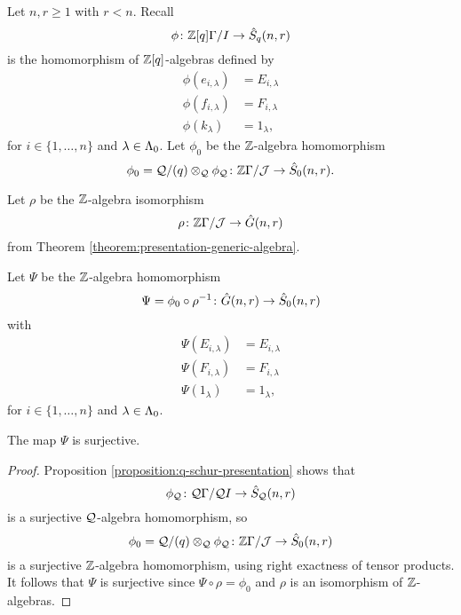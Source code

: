 \documentclass[a4paper, 11pt]{report}
\begin{document}
Let $n,r\geq 1$ with $r<n$. Recall
\begin{equation*}
\phi\colon\mathbb{Z}[q]\Gamma/I \to\hat{S}_q(n,r)
\end{equation*}
is the homomorphism of $\mathbb{Z}[q]$-algebras defined by
\begin{align*}
\phi(e_{i,\lambda})&= E_{i,\lambda}\\
\phi(f_{i,\lambda})&= F_{i,\lambda}\\
\phi(k_\lambda)&= 1_\lambda,
\end{align*}
for $i\in\{1,\ldots,n\}$ and $\lambda\in\Lambda_0{}$. Let $\phi_0$ be the $\mathbb{Z}$-algebra homomorphism
\begin{equation*}
\phi_0 = \mathcal{Q}/{(q)}\otimes_{\mathcal{Q}} \phi_{\mathcal{Q}} \colon \mathbb{Z}\Gamma/{\mathcal{J}}\to\hat{S}_0(n,r).
\end{equation*}

Let $\rho$ be the $\mathbb{Z}$-algebra isomorphism
\begin{equation*}
\rho\colon \mathbb{Z}\Gamma/{\mathcal{J}}\to\hat{G}(n,r)
\end{equation*}
from Theorem \ref{theorem:presentation-generic-algebra}.

Let $\Psi$ be the $\mathbb{Z}$-algebra homomorphism
\begin{equation}\label{equation:transfer-map}
\Psi=\phi_0\circ \rho^{-1}\colon\hat{G}(n,r)\to\hat{S}_0(n,r)
\end{equation}
with
\begin{align*}
\Psi(E_{i,\lambda})&= E_{i,\lambda}\\
\Psi(F_{i,\lambda})&= F_{i,\lambda}\\
\Psi(1_\lambda)&= 1_\lambda,
\end{align*}
for $i\in\{1,\ldots,n\}$ and $\lambda\in\Lambda_0{}$.

\begin{proposition}\label{proposition:transfer-map-surjective}
The map $\Psi$ is surjective.
\end{proposition}

\begin{proof}
Proposition \ref{proposition:q-schur-presentation} shows that
\begin{equation*}
\phi_{\mathcal{Q}}\colon \mathcal{Q}\Gamma/{\mathcal{Q}I}\to\hat{S}_{\mathcal{Q}}(n,r)
\end{equation*}
is a surjective $\mathcal{Q}$-algebra homomorphism, so
\begin{equation*}
\phi_0 = \mathcal{Q}/{(q)}\otimes_{\mathcal{Q}}\phi_{\mathcal{Q}} \colon \mathbb{Z}\Gamma/{\mathcal{J}}\to\hat{S}_0(n,r)
\end{equation*}
is a surjective $\mathbb{Z}$-algebra homomorphism, using right exactness of tensor products. It follows that $\Psi$ is surjective since $\Psi\circ\rho=\phi_0$ and $\rho$ is an isomorphism of $\mathbb{Z}$-algebras.
\end{proof}
\end{document}
